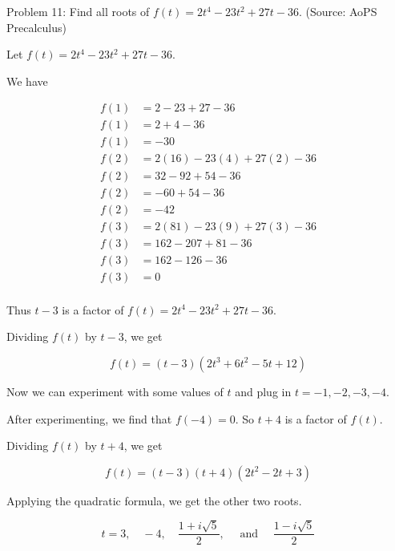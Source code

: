 Problem 11: Find all roots of $f(t) = 2t^4 -23t^2 +27t -36$. (Source: AoPS Precalculus)

Let $f(t) = 2t^4 - 23t^2 + 27t - 36$.

We have

\begin{align*}
f(1) &= 2 - 23 + 27 - 36 \\
f(1) &= 2 + 4 - 36 \\
f(1) &= - 30 \\
f(2) &= 2(16) - 23(4) + 27(2) - 36 \\
f(2) &= 32 - 92 + 54 - 36 \\
f(2) &= -60 + 54 - 36 \\
f(2) &= -42 \\
f(3) &= 2(81) - 23(9) + 27(3) - 36 \\
f(3) &= 162 - 207 + 81 - 36 \\
f(3) &= 162 - 126 - 36 \\
f(3) &= 0 \\
\end{align*}

Thus $t - 3$ is a factor of $f(t) = 2t^4 - 23t^2 + 27t - 36$.

Dividing $f(t)$ by $t - 3$, we get

\[ f(t) = (t - 3)(2t^3 + 6t^2 - 5t + 12) \]

Now we can experiment with some values of $t$ and plug in $t = -1, -2, -3, -4$.

After experimenting, we find that $f(-4) = 0$. So $t + 4$ is a factor of $f(t)$.

Dividing $f(t)$ by $t + 4$, we get

\[ f(t) = (t - 3)(t + 4)(2t^2 - 2t + 3) \]

Applying the quadratic formula, we get the other two roots.

\[ \boxed{t = 3, \quad -4, \quad \frac{1 + i\sqrt{5}}{2}, \quad \text{ and } \quad \frac{1 - i\sqrt{5}}{2}} \]
